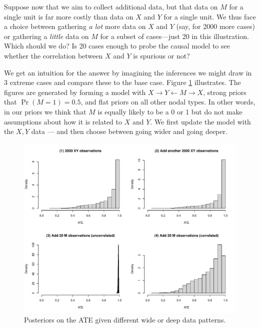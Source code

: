 \documentclass[
  12pt,
]{book}
\begin{document}
Suppose now that we aim to collect additional data, but that data on \(M\) for a single unit is far more costly than data on \(X\) and \(Y\) for a single unit. We thus face a choice between gathering \emph{a lot} more data on \(X\) and \(Y\) (say, for 2000 more cases) or gathering a \emph{little} data on \(M\) for a subset of cases---just 20 in this illustration. Which should we do? Is 20 cases enough to probe the causal model to see whether the correlation between \(X\) and \(Y\) is spurious or not?

We get an intuition for the answer by imagining the inferences we might draw in 3 extreme cases and compare these to the base case. Figure \ref{fig:widedeepXYMX} illustrates. The figures are generated by forming a model with \(X\rightarrow Y \leftarrow M \rightarrow X\), strong priors that \(\Pr(M=1)=0.5\), and flat priors on all other nodal types. In other words, in our priors we think that \(M\) is equally likely to be a 0 or 1 but do not make assumptions about how it is related to \(X\) and \(Y\). We first update the model with the \(X,Y\) data --- and then choose between going wider and going deeper.

\begin{figure}

{\centering \includegraphics{ii_files/figure-latex/widedeepXYMX-1} 

}

\caption{Posteriors on the ATE given different wide or deep data patterns.}\label{fig:widedeepXYMX}
\end{figure}
\end{document}
